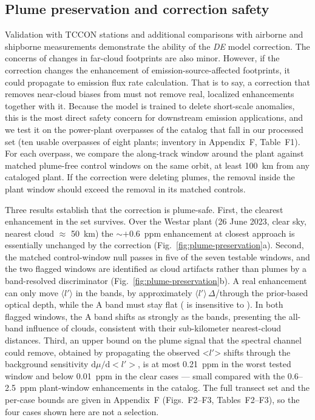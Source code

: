 \subsection{Plume preservation and correction safety}
\label{sec:result-plume}



Validation with TCCON stations and additional comparisons with airborne and shipborne measurements demonstrate the ability of the \emph{DE} model correction. The concerns of changes in far-cloud footprints are also minor. However, if the correction changes the \xco enhancement of emission-source-affected footprints, it could propagate to emission flux rate calculation. That is to say, a correction that removes near-cloud biases from \xco must not remove real, localized  enhancements together with it. Because the model is trained to delete short-scale anomalies, this is the most direct safety concern for downstream emission applications, and we test it on the power-plant overpasses of the \citet{nassar2017power_plants_oco2} catalog that fall in our processed set (ten usable overpasses of eight plants; inventory in Appendix~F, Table~F1). For each overpass, we compare the along-track window around the plant against matched plume-free control windows on the same orbit, at least 100~km from any cataloged plant. If the correction were deleting plumes, the removal inside the plant window should exceed the removal in its matched controls.



Three results establish that the correction is plume-safe. First, the clearest enhancement in the set survives. Over the Westar plant (26 June 2023, clear sky, nearest cloud $\approx$ 50~km) the
$\sim$$+0.6$~ppm enhancement at closest approach is essentially unchanged by the correction (Fig.~\ref{fig:plume-preservation}a). Second, the matched control-window null passes in five of the seven
testable windows, and the two flagged windows are identified as cloud artifacts rather than plumes by a band-resolved discriminator (Fig.~\ref{fig:plume-preservation}b). A real  enhancement can
only move $\langle l'\rangle$ in the  bands, by approximately $\langle l'\rangle\,\Delta$\xco/\xco through the prior-based optical depth, while the A band must stay flat ( is insensitive to ). In both flagged windows, the A band shifts as strongly as the  bands, presenting the all-band influence of clouds, consistent with their sub-kilometer nearest-cloud distances. Third, an upper bound on the plume signal that the spectral channel could remove, obtained by propagating the observed <$l'$> shifts through the background sensitivity $\mathrm{d}\mu/\mathrm{d}<l'>$, is at most 0.21~ppm in the worst tested window and below 0.01~ppm in the clear cases — small compared with the 0.6--2.5~ppm plant-window enhancements in the catalog. The full transect set and the per-case bounds are given in Appendix~F (Figs.~F2--F3, Tables~F2--F3), so the four cases shown here are not a selection.



